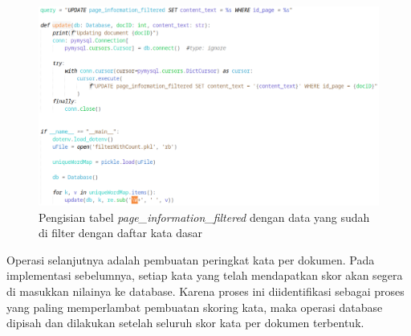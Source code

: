 \begin{figure}[H]
  \centering{}
	\includegraphics[width=\textwidth]{gambar/implementasi_pageinfo_filtered.png}
  \caption{Pengisian tabel \textit{page\_information\_filtered} dengan data yang 
  sudah di filter dengan daftar kata dasar}
\end{figure}

Operasi selanjutnya adalah pembuatan peringkat kata per dokumen. Pada 
implementasi sebelumnya, setiap kata yang telah mendapatkan skor akan segera di 
masukkan nilainya ke database. Karena proses ini diidentifikasi sebagai proses 
yang paling memperlambat pembuatan skoring kata, maka operasi database dipisah 
dan dilakukan setelah seluruh skor kata per dokumen terbentuk.

